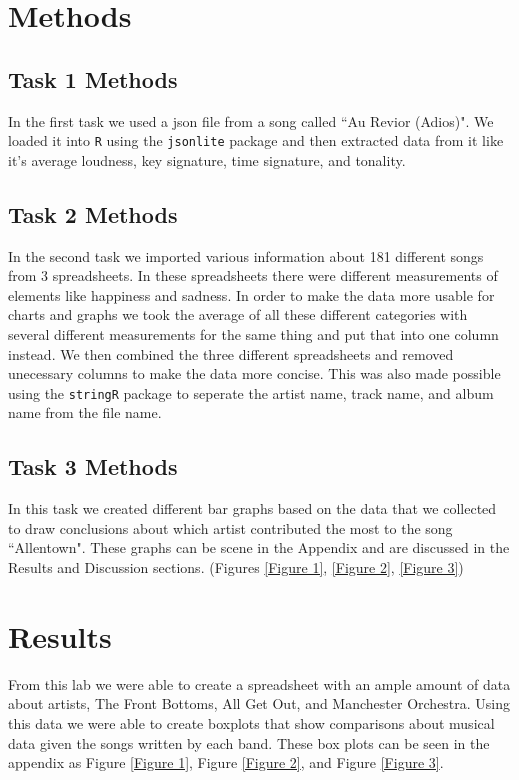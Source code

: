 \documentclass{article}\usepackage[]{graphicx}\usepackage[]{xcolor}
\begin{document}
\begin{multicols}{2}
\section{Methods}


\subsection{Task 1 Methods}

In the first task we used a json file from a song called ``Au Revior (Adios)". We loaded it into \texttt{R} using the \texttt{jsonlite} package and then extracted data from it like it's average loudness, key signature, time signature, and tonality. \citep{jsonlite}  

\subsection{Task 2 Methods}

In the second task we imported various information about 181 different songs from 3 spreadsheets. In these spreadsheets there were different measurements of elements like happiness and sadness. In order to make the data more usable for charts and graphs we took the average of all these different categories with several different measurements for the same thing and put that into one column instead. We then combined the three different spreadsheets and removed unecessary columns to make the data more concise. This was also made possible using the \texttt{stringR} package to seperate the artist name, track name, and album name from the file name. \citep{stringr}

\subsection{Task 3 Methods}

In this task we created different bar graphs based on the data that we collected to draw conclusions about which artist contributed the most to the song ``Allentown". These graphs can be scene in the Appendix and are discussed in the Results and Discussion sections. (Figures \ref{Figure 1}, \ref{Figure 2}, \ref{Figure 3})

\section{Results}
From this lab we were able to create a spreadsheet with an ample amount of data about artists, The Front Bottoms, All Get Out, and Manchester Orchestra. Using this data we were able to create boxplots that show comparisons about musical data given the songs written by each band. These box plots can be seen in the appendix as Figure \ref{Figure 1}, Figure \ref{Figure 2}, and Figure \ref{Figure 3}.



\end{multicols}
\end{document}
